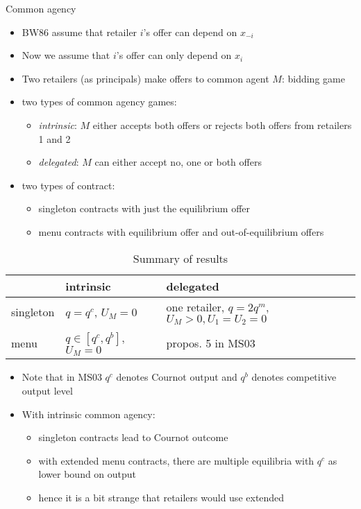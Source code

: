 \documentclass[11pt,english]{beamer}
\begin{document}
\begin{frame}[allowframebreaks]{Common agency}
  \begin{itemize}
  \item BW86 assume that retailer $i$'s offer can depend on $x_{-i}$
  \item Now we assume that $i$'s offer can only depend on $x_i$
  \item Two retailers (as principals) make offers to common agent $M$:
    bidding game
  \item two types of common agency games:
    \begin{itemize}
    \item \emph{intrinsic}: $M$ either accepts both offers or rejects
      both offers from retailers 1 and 2
    \item \emph{delegated}: $M$ can either accept no, one or both offers
    \end{itemize}
  \item two types of contract:
    \begin{itemize}
    \item singleton contracts with just the equilibrium offer
    \item menu contracts with equilibrium offer and out-of-equilibrium offers
    \end{itemize}
  \end{itemize}
  \begin{table}
    \centering
    \begin{tabularx}{\linewidth}{X|XX}
      & intrinsic & delegated \\ \hline
      singleton & $q = q^c$, $U_M =0$ & one retailer, $q =2q^m$, $U_M >0,U_1=U_2=0$  \\
      menu & $q \in [q^c,q^b]$, $U_M=0$  & propos. 5 in MS03
    \end{tabularx}
    \caption{Summary of results}
    \label{tab:summaryMS03}
  \end{table}
\begin{itemize}
\item Note that in MS03 $q^c$ denotes Cournot output and $q^b$ denotes
  competitive output level
\item With intrinsic common agency:
  \begin{itemize}
  \item singleton contracts lead to Cournot outcome
  \item with extended menu contracts, there are multiple equilibria
    with $q^c$ as lower bound on output
  \item hence it is a bit strange that retailers would use extended

\end{itemize}
\end{itemize}
\end{frame}
\end{document}
